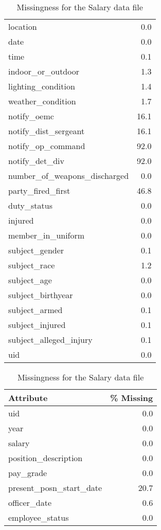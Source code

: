 \begin{table}[h]
\begin{minipage}[t]{0.5\textwidth}
\begin{tabular}{lr}
                    location &        0.0 \\
                        date &        0.0 \\
                        time &        0.1 \\
           indoor\_or\_outdoor &        1.3 \\
          lighting\_condition &        1.4 \\
           weather\_condition &        1.7 \\
                 notify\_oemc &       16.1 \\
        notify\_dist\_sergeant &       16.1 \\
           notify\_op\_command &       92.0 \\
              notify\_det\_div &       92.0 \\
number\_of\_weapons\_discharged &        0.0 \\
           party\_fired\_first &       46.8 \\
                 duty\_status &        0.0 \\
                     injured &        0.0 \\
           member\_in\_uniform &        0.0 \\
              subject\_gender &        0.1 \\
                subject\_race &        1.2 \\
                 subject\_age &        0.0 \\
           subject\_birthyear &        0.0 \\
               subject\_armed &        0.1 \\
             subject\_injured &        0.1 \\
      subject\_alleged\_injury &        0.1 \\
                         uid &        0.0 \\
\bottomrule
\end{tabular}
\vspace{2\baselineskip}
\caption{Missingness for the Salary data file}
\centering 
\begin{tabular}{lr}
\toprule
              Attribute &  \% Missing \\
\midrule
                    uid &        0.0 \\
                   year &        0.0 \\
                 salary &        0.0 \\
   position\_description &        0.0 \\
              pay\_grade &        0.0 \\
present\_posn\_start\_date &       20.7 \\
           officer\_date &        0.6 \\
        employee\_status &        0.0 \\
\bottomrule
\end{tabular}
\end{minipage}
\end{table}

